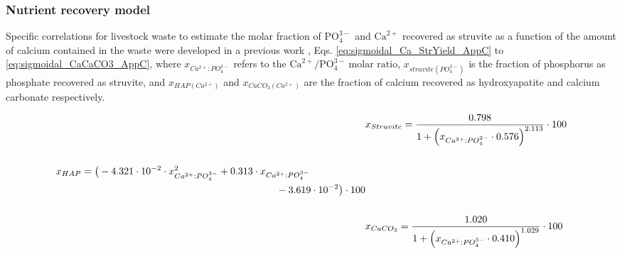 \begin{refsection}[referencesCh4]
\subsubsection{Nutrient recovery model}
Specific correlations for livestock waste to estimate the molar fraction of $\text{PO}_{4}^{3-}$ and $\text{Ca}^{2+}$ recovered as struvite as a function of the amount of calcium contained in the waste were developed in a previous work \citep{MartinStruvite}, Eqs. \ref{eq:sigmoidal_Ca_StrYield_AppC} to \ref{eq:sigmoidal_CaCaCO3_AppC}, where $x_{Ca^{2+}:PO_{4}^{3-}}$ refers to the $\text{Ca}^{2+}/\text{PO}_{4}^{3-} \ \text{molar ratio}$, $x_{struvite \left(PO_{4}^{3-}\right) }$ is the fraction of phosphorus as phosphate recovered as struvite, and $x_{HAP \left(Ca^{2+}\right)}$ and $x_{CaCO_{3} \left(Ca^{2+}\right)}$ are the fraction of calcium recovered as hydroxyapatite and calcium carbonate respectively.

\begin{align}
&x_{Struvite}= \frac{0.798}{1+\left(x_{Ca^{2+}:PO_{4}^{3-}} \cdot 0.576\right)^{2.113}} \cdot 100 \label{eq:sigmoidal_Ca_StrYield_AppC} \\
\nonumber \\
\begin{split}
& x_{HAP} =\big(-4.321 \cdot 10^{-2} \cdot x_{Ca^{2+}:PO_{4}^{3-}}^{2} + 0.313 \cdot x_{Ca^{2+}:PO_{4}^{3-}} \\& \hspace{7.8cm} - 3.619 \cdot 10^{-2} \big) \cdot 100 \label{eq:sigmoidal_Ca_HAP_AppC}
\end{split}
\\
\nonumber \\
&  x_{CaCO_{3}} = \frac{1.020}{1+\left(x_{Ca^{2+}:PO_{4}^{3-}} \cdot 0.410 \right)^{1.029}} \cdot 100 \label{eq:sigmoidal_CaCaCO3_AppC}
\end{align}


\end{refsection}
